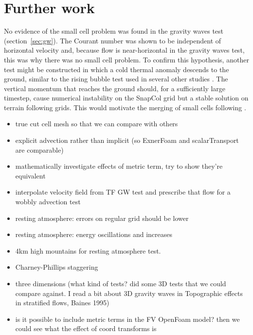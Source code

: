 \chapter{Further work}

No evidence of the small cell problem was found in the gravity waves test (section~\ref{sec:gw}).  The Courant number was shown to be independent of horizontal velocity and, because flow is near-horizontal in the gravity waves test, this was why there was no small cell problem.  To confirm this hypothesis, another test might be constructed in which a cold thermal anomaly descends to the ground, similar to the rising bubble test used in several other studies \parencites{bonaventura2000}{jebens2011}{good2013}.  The vertical momentum that reaches the ground should, for a sufficiently large timestep, cause numerical instability on the SnapCol grid but a stable solution on terrain following grids.  This would motivate the merging of small cells following \textcite{yamazaki-satomura2010}.

\begin{itemize}
\item true cut cell mesh so that we can compare with others
\item explicit advection rather than implicit (so ExnerFoam and scalarTransport are comparable)
\item mathematically investigate effects of metric term, try to show they're equivalent
\item interpolate velocity field from TF GW test and prescribe that flow for a wobbly advection test
\item resting atmosphere: errors on regular grid should be lower
\item resting atmosphere: energy oscillations and increases
\item 4km high mountains for resting atmosphere test.
\item Charney-Phillips staggering
\item three dimensions (what kind of tests?  \textcite{lock2012} did some 3D tests that we could compare against.  I read a bit about 3D gravity waves in Topographic effects in stratified flows, Baines 1995) 
\item is it possible to include metric terms in the FV OpenFoam model?  then we could see what the effect of coord transforms is
\end{itemize}
